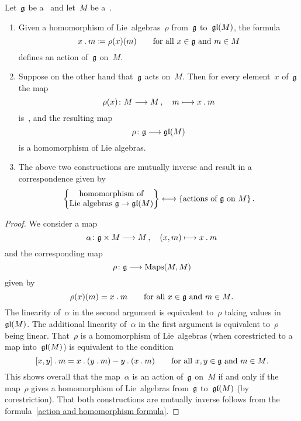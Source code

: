 \begin{proposition}
	\label{correspodence between representations and actions}
	Let~$\mathfrak{g}$ be a~\liealgebra{$\kf$} and let~$M$ be a~\vectorspace{$\kf$}.
	\begin{enumerate}
		\item
			Given a homomorphism of Lie~algebras~$\rho$ from~$\mathfrak{g}$ to~$\mathfrak{gl}(M)$, the formula
			\[
				x \mathbin{.} m \coloneqq \rho(x)(m)
				\qquad
				\text{for all~$x \in \mathfrak{g}$ and~$m \in M$}
			\]
			defines an action of~$\mathfrak{g}$ on~$M$.
		\item
			Suppose on the other hand that~$\mathfrak{g}$ acts on~$M$.
			Then for every element~$x$ of~$\mathfrak{g}$ the map
			\[
				\rho(x) \colon M \to M \,,
				\quad
				m \mapsto x \act m
			\]
			is~\linear{$\kf$}, and the resulting map
			\[
				\rho \colon \glie \to \gllie(M)
			\]
			is a homomorphism of Lie algebras.
		\item
			The above two constructions are mutually inverse and result in a {\onetoonetext} correspondence given by
			\[
				\left\{
					\begin{tabular}{@{}c@{}}
						homomorphism of
						\\
						Lie~algebras~$\glie \to \gllie(M)$
					\end{tabular}
				\right\}
				\onetoone
				\{
					\text{actions of~$\glie$ on~$M$}
				\} \,.
			\]
	\end{enumerate}
\end{proposition}


\begin{proof}
	We consider a map
	\[
		\alpha
		\colon
		\glie \times M
		\to
		M \,,
		\quad
		(x,m)
		\mapsto
		x \act m
	\]
	and the corresponding map
	\[
		\rho
		\colon
		\glie
		\to
		\Maps(M,M)
	\]
	given by
	\begin{equation}
		\label{action and homomorphism formula}
		\rho(x)(m) = x \mathbin{.} m
		\qquad
		\text{for all~$x \in \mathfrak{g}$ and~$m \in M$.}
	\end{equation}
	The linearity of~$\alpha$ in the second argument is equivalent to~$\rho$ taking values in~$\mathfrak{gl}(M)$.
	The additional linearity of~$\alpha$ in the first argument is equivalent to~$\rho$ being linear.
	That~$\rho$ is a homomorphism of Lie~algebras (when corestricted to a map into~$\mathfrak{gl}(M)$) is equivalent to the condition
	\[
		[x,y] \mathbin{.} m
		=
		x \mathbin{.} (y \mathbin{.} m) - y \mathbin{.} (x \mathbin{.} m)
		\qquad
		\text{for all~$x, y \in \mathfrak{g}$ and~$m \in M$.}
	\]
	This shows overall that the map~$\alpha$ is an action of~$\mathfrak{g}$ on~$M$ if and only if the map~$\rho$ gives a homomorphism of Lie~algebras from~$\mathfrak{g}$ to~$\mathfrak{gl}(M)$ (by corestriction).
	That both constructions are mutually inverse follows from the formula~\eqref{action and homomorphism formula}.
\end{proof}


